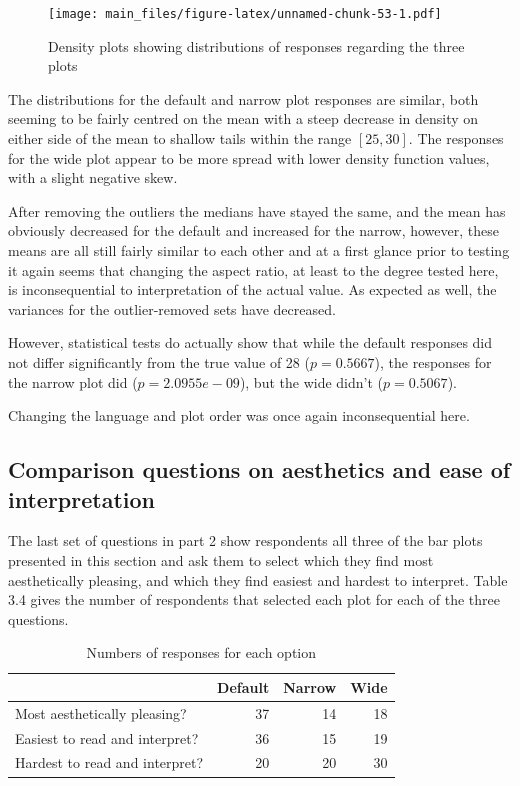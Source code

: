 \documentclass[
  11pt,
]{book}
\begin{document}
\begin{figure}
\centering
\texttt{[image: main\_files/figure-latex/unnamed-chunk-53-1.pdf]}
\caption{Density plots showing distributions of responses regarding the
three plots}
\end{figure}

The distributions for the default and narrow plot responses are similar,
both seeming to be fairly centred on the mean with a steep decrease in
density on either side of the mean to shallow tails within the range
\([25, 30]\). The responses for the wide plot appear to be more spread
with lower density function values, with a slight negative skew.

After removing the outliers the medians have stayed the same, and the
mean has obviously decreased for the default and increased for the
narrow, however, these means are all still fairly similar to each other
and at a first glance prior to testing it again seems that changing the
aspect ratio, at least to the degree tested here, is inconsequential to
interpretation of the actual value. As expected as well, the variances
for the outlier-removed sets have decreased.

However, statistical tests do actually show that while the default
responses did not differ significantly from the true value of 28
(\(p=0.5667\)), the responses for the narrow plot did
(\(p=2.0955e-09\)), but the wide didn't (\(p=0.5067\)).

Changing the language and plot order was once again inconsequential
here.

\subsection{Comparison questions on aesthetics and ease of interpretation}

The last set of questions in part 2 show respondents all three of the
bar plots presented in this section and ask them to select which they
find most aesthetically pleasing, and which they find easiest and
hardest to interpret. Table 3.4 gives the number of respondents that
selected each plot for each of the three questions.

\begin{table}[!h]

\caption{\label{tab:unnamed-chunk-55}Numbers of responses for each option}
\centering
\begin{tabular}[t]{l|r|r|r}
\hline
  & Default & Narrow & Wide\\
\hline
Most aesthetically pleasing? & 37 & 14 & 18\\
\hline
Easiest to read and interpret? & 36 & 15 & 19\\
\hline
Hardest to read and interpret? & 20 & 20 & 30\\
\hline
\end{tabular}
\end{table}
\end{document}
